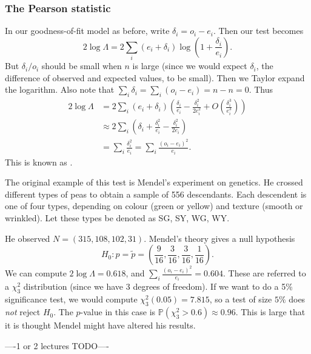 \documentclass[egregdoesnotlikesansseriftitles,a4paper]{scrartcl}
\begin{document}
\subsubsection*{The Pearson statistic}
In our goodness-of-fit model as before, write $\delta_i=o_i -e_i$. Then our test becomes \[
     2 \log \Lambda = 2 \sum_{i}^{}(e_i+\delta_i) \log \left( 1+\frac{\delta_i}{e_i}\right)
.\] But $\delta_i/o_i$ should be small when $n$ is large (since we would expect $\delta_i$, the difference of observed and expected values, to be small). Then we Taylor expand the logarithm. Also note that $\sum_{i}^{}\delta_i=\sum_{i}^{}(o_i-e_i)=n-n=0$. Thus
\begin{align*}
     2 \log \Lambda &= 2 \sum_{i}^{}(e_i+\delta_i) (\frac{\delta_i}{e_i}-\frac{\delta_i^2}{2e_i^2}+O (\frac{\delta_i^3}{e_i^3}))\\
     &\approx 2 \sum_{i}^{} (\delta_{i}+\frac{\delta_i^2}{e_i}-\frac{\delta_i^2}{2e_i})\\
     &=\sum_{i}^{}\frac{\delta_i^2}{e_i}=\sum_{i}^{}\frac{(o_i-e_i)^2}{e_i}.
\end{align*}
This is known as .
\begin{example*}
      The original example of this test is Mendel's experiment on genetics. He crossed different types of peas to obtain a sample of 556 descendants. Each descendent is one of four types, depending on colour (green or yellow) and texture (smooth or wrinkled). Let these types be denoted as SG, SY, WG, WY. 
      
      He observed $N= (315, 108, 102, 31)$. Mendel's theory gives a null hypothesis \[
      H_0 : p= \widetilde{p}= \left(\frac{9}{16}, \frac{3}{16}, \frac{3}{16},\frac{1}{16}\right)
      .\] We can compute $2 \log \Lambda=0.618$, and $\sum_{i}^{}\frac{(o_i-e_i)^2}{e_i}=0.604$. These are referred to a $\chi_3^2$ distribution (since we have 3 degrees of freedom). If we want to do a 5\% significance test, we would compute $\chi_3 ^2 (0.05)=7.815$, so a test of size $5\% $ does \emph{not} reject $H_0 $. The $p$-value in this case is $\mathbb{P} (\chi_3 ^2>0.6) \approx 0.96$. This is large that it is thought Mendel might have altered his results. 
\end{example*}
----1 or 2 lectures TODO----
\end{document}
